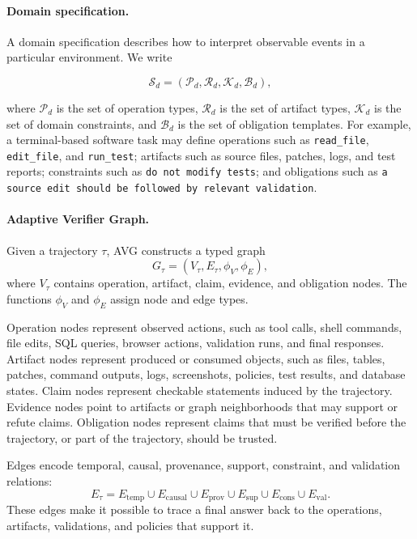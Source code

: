 \documentclass{article} %
\newcommand{\AVG}{\textsc{AVG}\xspace}
\begin{document}
\paragraph{Domain specification.}
A domain specification describes how to interpret observable events in a particular environment. We write

\begin{equation}
\mathcal{S}_d =
(\mathcal{P}_d,\mathcal{R}_d,\mathcal{K}_d,\mathcal{B}_d),
\end{equation}

where $\mathcal{P}_d$ is the set of operation types, $\mathcal{R}_d$ is the set of artifact types, $\mathcal{K}_d$ is the set of domain constraints, and $\mathcal{B}_d$ is the set of obligation templates. For example, a terminal-based software task may define operations such as \texttt{read\_file}, \texttt{edit\_file}, and \texttt{run\_test}; artifacts such as source files, patches, logs, and test reports; constraints such as \texttt{do not modify tests}; and obligations such as \texttt{a source edit should be followed by relevant validation}.

\paragraph{Adaptive Verifier Graph.}

Given a trajectory $\tau$, \AVG constructs a typed graph
\begin{equation}
G_\tau = (V_\tau,E_\tau,\phi_V,\phi_E),
\end{equation}
where $V_\tau$ contains operation, artifact, claim, evidence, and obligation nodes. The functions $\phi_V$ and $\phi_E$ assign node and edge types.

Operation nodes represent observed actions, such as tool calls, shell commands, file edits, SQL queries, browser actions, validation runs, and final responses. Artifact nodes represent produced or consumed objects, such as files, tables, patches, command outputs, logs, screenshots, policies, test results, and database states. Claim nodes represent checkable statements induced by the trajectory. Evidence nodes point to artifacts or graph neighborhoods that may support or refute claims. Obligation nodes represent claims that must be verified before the trajectory, or part of the trajectory, should be trusted.

Edges encode temporal, causal, provenance, support, constraint, and validation relations:
\begin{equation}
E_\tau =
E_{\mathrm{temp}}
\cup E_{\mathrm{causal}}
\cup E_{\mathrm{prov}}
\cup E_{\mathrm{sup}}
\cup E_{\mathrm{cons}}
\cup E_{\mathrm{val}}.
\end{equation}
These edges make it possible to trace a final answer back to the operations, artifacts, validations, and policies that support it.
\end{document}

